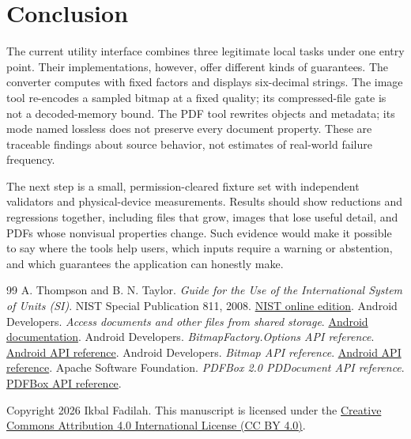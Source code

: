 \documentclass[10pt,letterpaper]{article}
\begin{document}
\section{Conclusion}

The current utility interface combines three legitimate local tasks under one entry point. Their implementations, however, offer different kinds of guarantees. The converter computes with fixed factors and displays six-decimal strings. The image tool re-encodes a sampled bitmap at a fixed quality; its compressed-file gate is not a decoded-memory bound. The PDF tool rewrites objects and metadata; its mode named lossless does not preserve every document property. These are traceable findings about source behavior, not estimates of real-world failure frequency.

The next step is a small, permission-cleared fixture set with independent validators and physical-device measurements. Results should show reductions and regressions together, including files that grow, images that lose useful detail, and PDFs whose nonvisual properties change. Such evidence would make it possible to say where the tools help users, which inputs require a warning or abstention, and which guarantees the application can honestly make.

\begin{thebibliography}{99}
 A. Thompson and B. N. Taylor. \emph{Guide for the Use of the International System of Units (SI)}. NIST Special Publication 811, 2008. \href{https://physics.nist.gov/cuu/pdf/sp811.pdf}{NIST online edition}.
 Android Developers. \emph{Access documents and other files from shared storage}. \href{https://developer.android.com/training/data-storage/shared/documents-files}{Android documentation}.
 Android Developers. \emph{BitmapFactory.Options API reference}. \href{https://developer.android.com/reference/android/graphics/BitmapFactory.Options}{Android API reference}.
 Android Developers. \emph{Bitmap API reference}. \href{https://developer.android.com/reference/android/graphics/Bitmap}{Android API reference}.
 Apache Software Foundation. \emph{PDFBox 2.0 PDDocument API reference}. \href{https://pdfbox.apache.org/docs/2.0.13/javadocs/org/apache/pdfbox/pdmodel/PDDocument.html}{PDFBox API reference}.
\end{thebibliography}
\noindent\footnotesize Copyright 2026 Ikbal Fadilah. This manuscript is licensed under the \href{https://creativecommons.org/licenses/by/4.0/}{Creative Commons Attribution 4.0 International License (CC BY 4.0)}.
\end{document}
